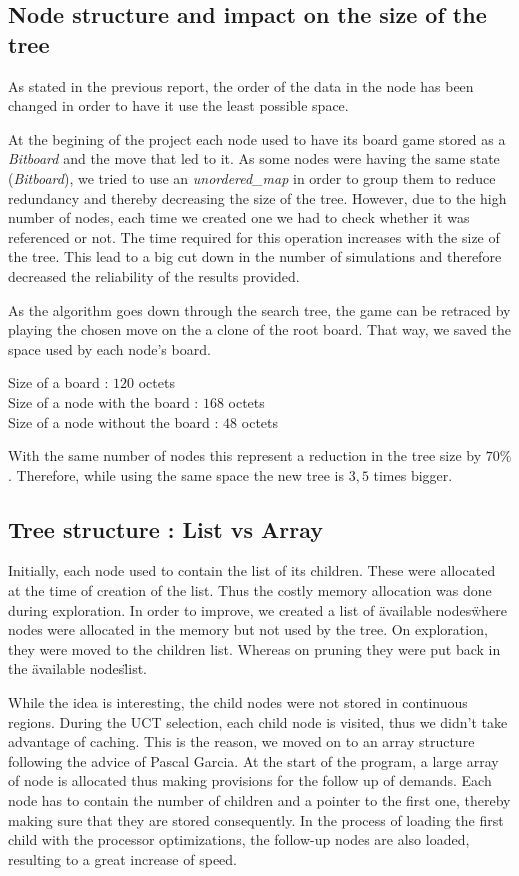 \subsection{Node structure and impact on the size of the tree}

As stated in the previous report, the order of the data in the node has been changed in order to have it use the least possible space.

At the begining of the project each node used to have its board game stored as a \textit{Bitboard} and the move that led to it. As some nodes were having the same state (\textit{Bitboard}), we tried to use an \textit{unordered\_map} in order to group them to reduce redundancy and thereby decreasing the size of the tree. However, due to the high number of nodes, each time we created one we had to check whether it was referenced or not. The time required for this operation increases with the size of the tree. This lead to a big cut down in the number of simulations and therefore decreased the reliability of the results provided.

As the algorithm goes down through the search tree, the game can be retraced by playing the chosen move on the a clone of the root board. That way, we saved the space used by each node's board.

\noindent
Size of a board : $120$ octets\\
Size of a node with the board : $168$ octets\\
Size of a node without the board : $48$ octets

With the same number of nodes this represent a reduction in the tree size by $70\%$. Therefore, while using the same space the new tree is $3,5$ times bigger.

\subsection{Tree structure : List vs Array}

Initially, each node used to contain the list of its children. These were allocated at the time of creation of the list. Thus the costly memory allocation was done during exploration.
In order to improve, we created a list of \"available nodes\" where nodes were allocated in the memory but not used by the tree. On exploration, they were moved to the children list. Whereas on pruning they were put back in the \"available nodes\" list.

While the idea is interesting, the child nodes were not stored in continuous regions. During the UCT selection, each child node is visited, thus we didn't take advantage of caching. This is the reason, we moved on to an array structure following the advice of Pascal Garcia. At the start of the program, a large array of node is allocated thus making provisions for the follow up of demands. Each node has to contain the number of children and a pointer to the first one, thereby making sure that they are stored consequently. In the process of loading the first child with the processor optimizations, the follow-up nodes are also loaded, resulting to a great increase of speed.

